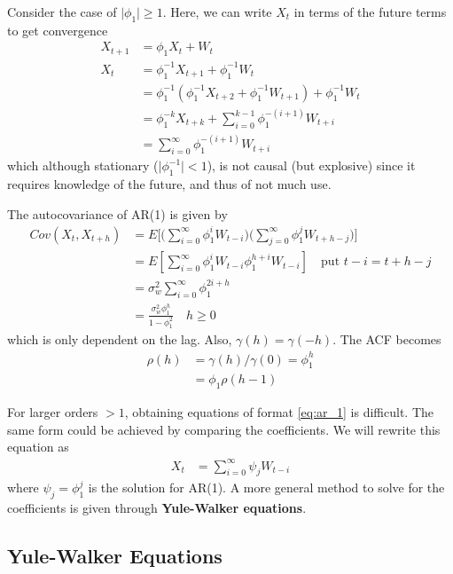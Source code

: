 \documentclass[../../time_series_notes.tex]{subfiles}
\begin{document}
Consider the case of $\lvert \phi_{1} \rvert \geq 1$. Here, we can write $X_{t}$ in terms of the future terms to get convergence
\begin{align*}
    X_{t+1} &= \phi_{1}X_{t} + W_{t}\\
    X_{t} &= \phi_{1}^{-1}X_{t+1} + \phi_{1}^{-1}W_{t}\\
    &= \phi_{1}^{-1}(\phi_{1}^{-1}X_{t+2} + \phi_{1}^{-1}W_{t+1}) + \phi_{1}^{-1}W_{t}\\
    &= \phi_{1}^{-k}X_{t+k} + \sum_{i=0}^{k-1}\phi_{1}^{-(i+1)}W_{t+i}\\
    &= \sum_{i=0}^{\infty}\phi_{1}^{-(i+1)}W_{t+i}
\end{align*}
which although stationary ($\lvert \phi_{1}^{-1} \rvert < 1$), is not causal (but explosive) since it requires knowledge of the future, and thus of not much use.\newline

The autocovariance of AR(1) is given by
\begin{align*}
    Cov(X_{t}, X_{t+h}) &= E \bigg[\bigg(\sum_{i=0}^{\infty}\phi_{1}^{i}W_{t-i} \bigg) \bigg(\sum_{j=0}^{\infty}\phi_{1}^{j}W_{t+h-j} \bigg) \bigg]\\
    &= E[\sum_{i=0}^{\infty}\phi_{1}^{i}W_{t-i} \phi_{1}^{h+i}W_{t-i}] \quad \text{put $t-i = t+h-j$}\\
    &= \sigma_{w}^{2} \sum_{i=0}^{\infty}\phi_{1}^{2i+h}\\
    &= \frac{\sigma_{w}^{2} \phi_{1}^{h}}{1-\phi_{1}^{2}} \quad h \geq 0
\end{align*}
which is only dependent on the lag. Also, $\gamma(h) = \gamma(-h)$. The ACF becomes
\begin{align*}
    \rho(h) &= \gamma(h)/\gamma(0) = \phi_{1}^{h}\\
     &= \phi_{1}\rho(h-1)
\end{align*}

For larger orders $> 1$, obtaining equations of format \eqref{eq:ar_1} is difficult. The same form could be achieved by comparing the coefficients. We will rewrite this equation as
\begin{align*}
    X_{t} &= \sum_{i=0}^{\infty}\psi_{j}W_{t-i}
\end{align*}
where $\psi_{j} = \phi_{1}^{j}$ is the solution for AR(1). A more general method to solve for the coefficients is given through \textbf{Yule-Walker equations}.

\subsection{Yule-Walker Equations}
\end{document}
